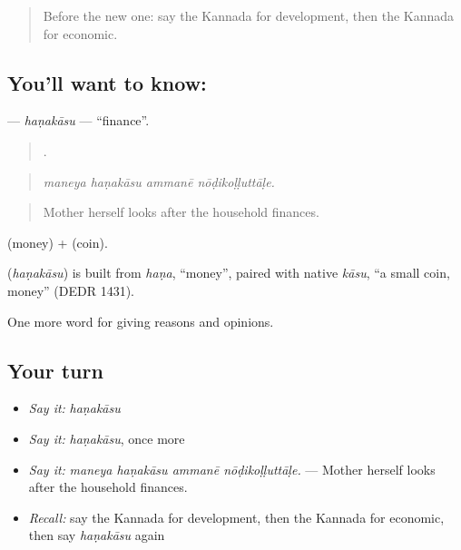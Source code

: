 \label{lesson:KA-C401-hanakasu}



\begin{quote}
Before the new one: say the Kannada for development, then the Kannada for economic.
\end{quote}

\subsection*{You'll want to know: }
\textbf{} — \emph{haṇakāsu} — \textquotedblleft{}finance\textquotedblright{}.

\begin{quote}
   .
\end{quote}

\begin{quote}
\emph{maneya haṇakāsu ammanē nōḍikoḷḷuttāḷe.}
\end{quote}

\begin{quote}
Mother herself looks after the household finances.
\end{quote}

 (money) +  (coin).

\begin{cousinweb}
\textbf{} (\emph{haṇakāsu}) is built from \emph{haṇa}, \textquotedblleft{}money\textquotedblright{}, paired with native \emph{kāsu}, \textquotedblleft{}a small coin, money\textquotedblright{} (DEDR 1431).
\end{cousinweb}

\begin{grammarlens}[title={What you've built}]
One more word for giving reasons and opinions.
\end{grammarlens}

\subsection*{Your turn}
\begin{itemize}
\raggedright
  \item \emph{Say it:} \emph{haṇakāsu}
  \item \emph{Say it:} \emph{haṇakāsu}, once more
  \item \emph{Say it:} \emph{maneya haṇakāsu ammanē nōḍikoḷḷuttāḷe.} — Mother herself looks after the household finances.
  \item \emph{Recall:} say the Kannada for development, then the Kannada for economic, then say \emph{haṇakāsu} again
\end{itemize}

